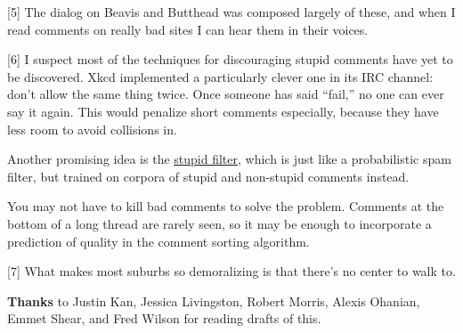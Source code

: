 {[}5{]} The dialog on Beavis and Butthead was composed largely of these,
and when I read comments on really bad sites I can hear them in their
voices.

{[}6{]} I suspect most of the techniques for discouraging stupid
comments have yet to be discovered. Xkcd implemented a particularly
clever one in its IRC channel: don't allow the same thing twice. Once
someone has said ``fail,'' no one can ever say it again. This would
penalize short comments especially, because they have less room to avoid
collisions in.

Another promising idea is the \href{http://stupidfilter.org}{stupid
filter}, which is just like a probabilistic spam filter, but trained on
corpora of stupid and non-stupid comments instead.

You may not have to kill bad comments to solve the problem. Comments at
the bottom of a long thread are rarely seen, so it may be enough to
incorporate a prediction of quality in the comment sorting algorithm.

{[}7{]} What makes most suburbs so demoralizing is that there's no
center to walk to.

\textbf{Thanks} to Justin Kan, Jessica Livingston, Robert Morris, Alexis
Ohanian, Emmet Shear, and Fred Wilson for reading drafts of this.
